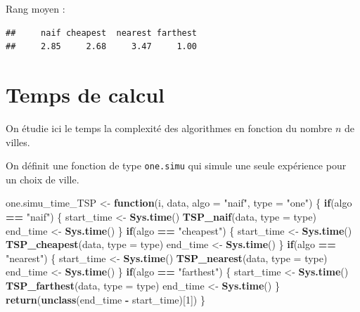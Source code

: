 \documentclass[
]{article}
\newenvironment{Shaded}{\begin{snugshade}}{\end{snugshade}}
\newcommand{\AttributeTok}[1]{\textcolor[rgb]{0.13,0.29,0.53}{#1}}
\newcommand{\ControlFlowTok}[1]{\textcolor[rgb]{0.13,0.29,0.53}{\textbf{#1}}}
\newcommand{\DecValTok}[1]{\textcolor[rgb]{0.00,0.00,0.81}{#1}}
\newcommand{\FunctionTok}[1]{\textcolor[rgb]{0.13,0.29,0.53}{\textbf{#1}}}
\newcommand{\NormalTok}[1]{#1}
\newcommand{\OtherTok}[1]{\textcolor[rgb]{0.56,0.35,0.01}{#1}}
\newcommand{\SpecialCharTok}[1]{\textcolor[rgb]{0.81,0.36,0.00}{\textbf{#1}}}
\newcommand{\StringTok}[1]{\textcolor[rgb]{0.31,0.60,0.02}{#1}}
\begin{document}
Rang moyen :

\begin{verbatim}
##     naif cheapest  nearest farthest 
##     2.85     2.68     3.47     1.00
\end{verbatim}

\section{Temps de calcul}\label{temps-de-calcul}

On étudie ici le temps la complexité des algorithmes en fonction du
nombre \(n\) de villes.

On définit une fonction de type \texttt{one.simu} qui simule une seule
expérience pour un choix de ville.

\begin{Shaded}
\begin{Highlighting}[]
\NormalTok{one.simu\_time\_TSP }\OtherTok{\textless{}{-}} \ControlFlowTok{function}\NormalTok{(i, data, }\AttributeTok{algo =} \StringTok{"naif"}\NormalTok{, }\AttributeTok{type =} \StringTok{"one"}\NormalTok{)}
\NormalTok{\{}
  \ControlFlowTok{if}\NormalTok{(algo }\SpecialCharTok{==} \StringTok{"naif"}\NormalTok{)}
\NormalTok{  \{}
\NormalTok{    start\_time }\OtherTok{\textless{}{-}} \FunctionTok{Sys.time}\NormalTok{()}
    \FunctionTok{TSP\_naif}\NormalTok{(data, }\AttributeTok{type =}\NormalTok{ type)}
\NormalTok{    end\_time  }\OtherTok{\textless{}{-}} \FunctionTok{Sys.time}\NormalTok{()}
\NormalTok{  \}}
  \ControlFlowTok{if}\NormalTok{(algo }\SpecialCharTok{==} \StringTok{"cheapest"}\NormalTok{)}
\NormalTok{  \{}
\NormalTok{    start\_time }\OtherTok{\textless{}{-}} \FunctionTok{Sys.time}\NormalTok{()}
    \FunctionTok{TSP\_cheapest}\NormalTok{(data, }\AttributeTok{type =}\NormalTok{ type)}
\NormalTok{    end\_time  }\OtherTok{\textless{}{-}} \FunctionTok{Sys.time}\NormalTok{()}
\NormalTok{  \}}
  \ControlFlowTok{if}\NormalTok{(algo }\SpecialCharTok{==} \StringTok{"nearest"}\NormalTok{)}
\NormalTok{  \{}
\NormalTok{    start\_time }\OtherTok{\textless{}{-}} \FunctionTok{Sys.time}\NormalTok{()}
    \FunctionTok{TSP\_nearest}\NormalTok{(data, }\AttributeTok{type =}\NormalTok{ type)}
\NormalTok{    end\_time  }\OtherTok{\textless{}{-}} \FunctionTok{Sys.time}\NormalTok{()}
\NormalTok{  \}}
  \ControlFlowTok{if}\NormalTok{(algo }\SpecialCharTok{==} \StringTok{"farthest"}\NormalTok{)}
\NormalTok{  \{}
\NormalTok{    start\_time }\OtherTok{\textless{}{-}} \FunctionTok{Sys.time}\NormalTok{()}
    \FunctionTok{TSP\_farthest}\NormalTok{(data, }\AttributeTok{type =}\NormalTok{ type)}
\NormalTok{    end\_time  }\OtherTok{\textless{}{-}} \FunctionTok{Sys.time}\NormalTok{()}
\NormalTok{  \}}
  \FunctionTok{return}\NormalTok{(}\FunctionTok{unclass}\NormalTok{(end\_time }\SpecialCharTok{{-}}\NormalTok{ start\_time)[}\DecValTok{1}\NormalTok{])}
\NormalTok{\}}
\end{Highlighting}
\end{Shaded}
\end{document}
